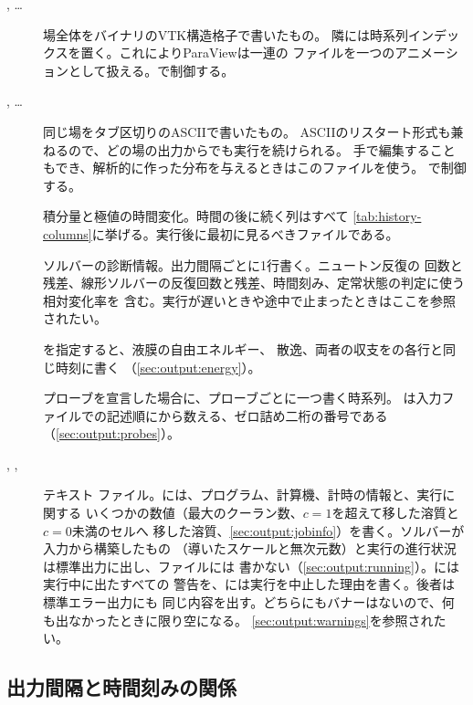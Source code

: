 \begin{description}
  \item[, \dots] 場全体をバイナリのVTK構造格子で書いたもの。
    隣には時系列インデックスを置く。これによりParaViewは一連の
    ファイルを一つのアニメーションとして扱える。で制御する。
  \item[, \dots] 同じ場をタブ区切りのASCIIで書いたもの。
    ASCIIのリスタート形式も兼ねるので、どの場の出力からでも実行を続けられる。
    手で編集することもでき、解析的に作った分布を与えるときはこのファイルを使う。
    で制御する。
  \item[] 積分量と極値の時間変化。時間の後に続く列はすべて
    \cref{tab:history-columns}に挙げる。実行後に最初に見るべきファイルである。
  \item[] ソルバーの診断情報。出力間隔ごとに1行書く。ニュートン反復の
    回数と残差、線形ソルバーの反復回数と残差、時間刻み、定常状態の判定に使う相対変化率を
    含む。実行が遅いときや途中で止まったときはここを参照されたい。
  \item[] を指定すると、液膜の自由エネルギー、
    散逸、両者の収支をの各行と同じ時刻に書く
    （\cref{sec:output:energy}）。
  \item[] プローブを宣言した場合に、プローブごとに一つ書く時系列。
    は入力ファイルでの記述順にから数える、ゼロ詰め二桁の番号である
    （\cref{sec:output:probes}）。
  \item[, , ] テキスト
    ファイル。には、プログラム、計算機、計時の情報と、実行に関する
    いくつかの数値（最大のクーラン数、$c = 1$を超えて移した溶質と$c = 0$未満のセルへ
    移した溶質、\cref{sec:output:jobinfo}）を書く。ソルバーが入力から構築したもの
    （導いたスケールと無次元数）と実行の進行状況は標準出力に出し、ファイルには
    書かない（\cref{sec:output:running}）。には実行中に出たすべての
    警告を、には実行を中止した理由を書く。後者は標準エラー出力にも
    同じ内容を出す。どちらにもバナーはないので、何も出なかったときに限り空になる。
    \cref{sec:output:warnings}を参照されたい。
\end{description}

\subsection{出力間隔と時間刻みの関係}
\label{sec:output:intervals}

